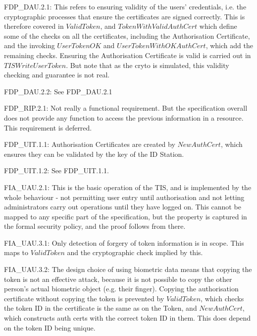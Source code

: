 {\footnotesize \sf 
FDP\_DAU.2.1:
}
\newline
	This refers to ensuring validity of the users' credentials,
	i.e. the cryptographic processes that ensure the certificates
	are signed correctly. This is therefore covered in
	$ValidToken$, and $TokenWithValidAuthCert$
	which define some of the checks on all the certificates,
	including the Authorisation Certificate, and the invoking
	$UserTokenOK$ and $UserTokenWithOKAuthCert$, which add the
	remaining checks. Ensuring the Authorisation Certificate is
	valid is carried out in $TISWriteUserToken$. But note that as
	the cryto is simulated, this validity checking and guarantee
	is not real. 

{\footnotesize \sf 
FDP\_DAU.2.2:
}
\newline
	See FDP\_DAU.2.1

{\footnotesize \sf 
FDP\_RIP.2.1:
}
\newline
	Not really a functional requirement. But the specification
	overall does not provide any function to access the previous
	information in a resource. This requirement is deferred.

{\footnotesize \sf 
FDP\_UIT.1.1:
}
\newline
	Authorisation Certificates are created by $NewAuthCert$, which
	ensures they can be validated by the key of the ID Station. 

{\footnotesize \sf 
FDP\_UIT.1.2:
}
\newline
	See FDP\_UIT.1.1.


{\footnotesize \sf 
FIA\_UAU.2.1:
}
\newline
	This is the basic operation of the TIS, and is implemented by
	the whole behaviour - not permitting user entry until
	authorisation and not letting administrators carry out
	operations until they have logged on. This cannot be mapped to
	any specific part of the specification, but the property is
	captured in the formal security policy, and the proof follows
	from there. 

{\footnotesize \sf 
FIA\_UAU.3.1:
}
\newline
	Only detection of forgery of token information is in
	scope. This maps to $ValidToken$ and the cryptographic check
	implied by this. 

{\footnotesize \sf 
FIA\_UAU.3.2:
}
\newline
	The design choice of using biometric data means that copying
	the token is not an effective attack, because it is not
	possible to copy the other person's actual biometric object
	(e.g. their finger). Copying the authorisation certificate
	without copying the token is prevented by $ValidToken$, which
	checks the token ID in the certificate is the same as on the
	Token, and $NewAuthCert$, which constructs auth certs with the
	correct token ID in them. This does depend on the token ID
	being unique. 

